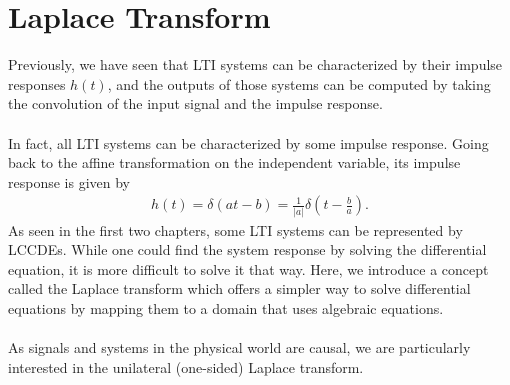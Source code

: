 \documentclass{report}
\begin{document}
\setcounter{chapter}{3}
\setcounter{page}{44}
\chapter{Laplace Transform}
Previously, we have seen that LTI systems can be characterized by their impulse responses $h(t)$, and the outputs of those systems can be computed 
by taking the convolution of the input signal and the impulse response. 
\\ \\ 
In fact, all LTI systems can be characterized by some impulse response. Going back 
to the affine transformation on the independent variable, its impulse response is given by 
\begin{align}
    h(t)=\delta(at-b)=\frac{1}{|a|}\delta\left(t-\frac{b}{a}\right).
\end{align}
As seen in the first two chapters, some LTI systems can be represented by LCCDEs. While one could find the system response by solving the differential equation, 
it is more difficult to solve it that way. Here, we introduce a concept called the Laplace transform which offers a simpler way to solve differential equations 
by mapping them to a domain that uses algebraic equations.
\\ \\
As signals and systems in the physical world are causal, we are particularly interested in the unilateral (one-sided) Laplace transform. 
\end{document}
